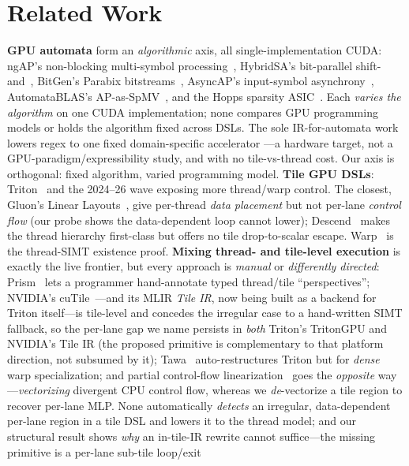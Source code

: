 \documentclass[conference]{IEEEtran}
\begin{document}
\section{Related Work}
\textbf{GPU automata} form an \emph{algorithmic} axis, all single-implementation CUDA: ngAP's
non-blocking multi-symbol processing~\cite{ngap2024}, HybridSA's bit-parallel
shift-and~\cite{hybridsa2024}, BitGen's Parabix bitstreams~\cite{bitgen2025}, AsyncAP's
input-symbol asynchrony~\cite{asyncap2023}, AutomataBLAS's AP-as-SpMV~\cite{automatablas2025}, and
the Hopps sparsity ASIC~\cite{hopps2025}. Each \emph{varies the algorithm} on one CUDA
implementation; none compares GPU programming models or holds the algorithm fixed across DSLs. The
sole IR-for-automata work~\cite{mlirregex2025} lowers regex to one fixed domain-specific accelerator
---a hardware target, not a GPU-paradigm/expressibility study, and with no tile-vs-thread cost. Our
axis is orthogonal: fixed algorithm, varied programming model.
\textbf{Tile GPU DSLs}: Triton~\cite{triton2019} and the 2024--26 wave exposing more thread/warp
control. The closest, Gluon's Linear Layouts~\cite{linearlayouts2025}, give per-thread \emph{data
placement} but not per-lane \emph{control flow} (our probe shows the data-dependent loop cannot
lower); Descend~\cite{descend2024} makes the thread hierarchy first-class but offers no tile
drop-to-scalar escape. Warp~\cite{warp2022} is the thread-SIMT existence proof.
\textbf{Mixing thread- and tile-level execution} is exactly the live frontier, but every approach is
\emph{manual} or \emph{differently directed}: Prism~\cite{prism2026} lets a programmer hand-annotate
typed thread/tile ``perspectives''; NVIDIA's cuTile~\cite{cutile2025}---and its MLIR \emph{Tile IR}, now
being built as a backend for Triton itself---is tile-level and concedes the irregular case to a
hand-written SIMT fallback, so the per-lane gap we name persists in \emph{both} Triton's TritonGPU and
NVIDIA's Tile IR (the proposed primitive is complementary to that platform direction, not subsumed by it); Tawa~\cite{tawa2026} auto-restructures Triton but for
\emph{dense} warp specialization; and partial control-flow linearization~\cite{partialcfg2018} goes the
\emph{opposite} way---\emph{vectorizing} divergent CPU control flow, whereas we \emph{de}-vectorize a
tile region to recover per-lane MLP. None automatically \emph{detects} an irregular, data-dependent
per-lane region in a tile DSL and lowers it to the thread model; and our structural result shows
\emph{why} an in-tile-IR rewrite cannot suffice---the missing primitive is a per-lane sub-tile loop/exit
\end{document}
